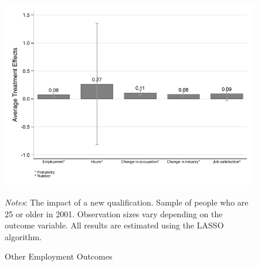 \documentclass[12pt, a4paper]{article}
\begin{document}
\begin{figure}[htbp]
\centering
\caption{Other Employment Outcomes}
\vspace{0.5cm}
  \label{fig:empl}
    \includegraphics{_figures/SPRC_fig5_empltr.pdf}
\parbox{1\textwidth}{\footnotesize{\textit{Notes}: The impact of a new qualification. Sample of people who are 25 or older in 2001. Observation sizes vary depending on the outcome variable. All results are estimated using the LASSO algorithm.}}
\end{figure}

%
%
\end{document}

